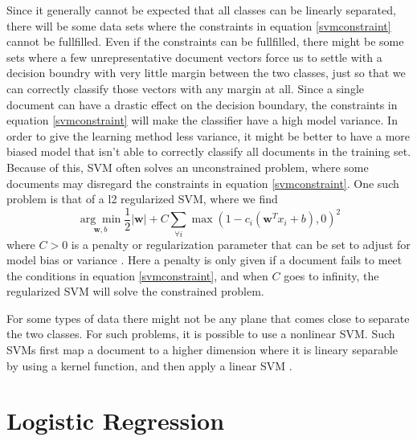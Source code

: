 Since it generally cannot be expected that all classes can be linearly separated, there will be some data sets where the constraints in equation \ref{svmconstraint} cannot be fullfilled. Even if the constraints can be fullfilled, there might be some sets where a few unrepresentative document vectors force us to settle with a decision boundry with very little margin between the two classes, just so that we can correctly classify those vectors with any margin at all. Since a single document can have a drastic effect on the decision boundary, the constraints in equation \ref{svmconstraint} will make the classifier have a high model variance. In order to give the learning method less variance, it might be better to have a more biased model that isn't able to correctly classify all documents in the training set. Because of this, SVM often solves an unconstrained problem, where some documents may disregard the constraints in equation \ref{svmconstraint}. One such problem is that of a l2 regularized SVM, where we find
\begin{equation}
\label{svmregularized}
\underset{\mathbf{w}, b}{\arg \min} \frac{1}{2}|\mathbf{w}|+C\sum_{\forall i} \max(1-c_i(\mathbf{w}^Tx_i+b), 0)^2
\end{equation}
where $C > 0$ is a penalty or regularization parameter that can be set to adjust for model bias or variance \cite{liblinear}. Here a penalty is only given if a document fails to meet the conditions in equation \ref{svmconstraint}, and when $C$ goes to infinity, the regularized SVM will solve the constrained problem.

For some types of data there might not be any plane that comes close to separate the two classes. For such problems, it is possible to use a nonlinear SVM. Such SVMs first map a document to a higher dimension where it is lineary separable by using a kernel function, and then apply a linear SVM \cite[p. 331]{information}. 

\section{Logistic Regression}

